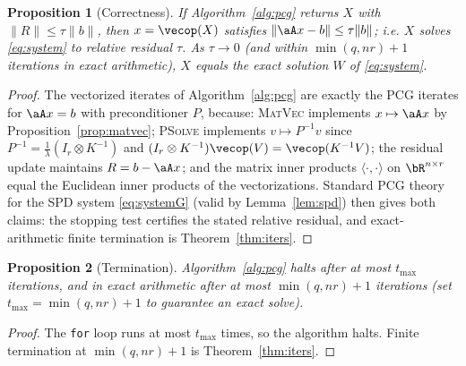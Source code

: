 \documentclass[12pt]{article}
\newtheorem{proposition}{Proposition}
\theoremstyle{definition}
\begin{document}
\begin{proposition}[Correctness]
If Algorithm~\ref{alg:pcg} returns $X$ with $\|R\|\le\tau\|b\|$, then
$x=\vecop(X)$ satisfies $\|\aA x-b\|\le\tau\|b\|$; i.e. $X$ solves
\eqref{eq:system} to relative residual $\tau$. As $\tau\to0$ (and within
$\min(q,nr)+1$ iterations in exact arithmetic), $X$ equals the exact solution
$W$ of \eqref{eq:system}.
\end{proposition}
\begin{proof}
The vectorized iterates of Algorithm~\ref{alg:pcg} are exactly the PCG iterates
for $\aA x=b$ with preconditioner $P$, because: \textsc{MatVec} implements
$x\mapsto\aA x$ by Proposition~\ref{prop:matvec}; \textsc{PSolve} implements
$v\mapsto P^{-1}v$ since $P^{-1}=\tfrac1\lambda(I_r\otimes K^{-1})$ and
$(I_r\otimes K^{-1})\vecop(V)=\vecop(K^{-1}V)$; the residual update maintains
$R=b-\aA x$; and the matrix inner products $\langle\cdot,\cdot\rangle$ on
$\bR^{n\times r}$ equal the Euclidean inner products of the vectorizations.
Standard PCG theory for the SPD system \eqref{eq:systemG} (valid by
Lemma~\ref{lem:spd}) then gives both claims: the stopping test certifies the
stated relative residual, and exact-arithmetic finite termination is
Theorem~\ref{thm:iters}.
\end{proof}

\begin{proposition}[Termination]
Algorithm~\ref{alg:pcg} halts after at most $t_{\max}$ iterations, and in exact
arithmetic after at most $\min(q,nr)+1$ iterations (set
$t_{\max}=\min(q,nr)+1$ to guarantee an exact solve).
\end{proposition}
\begin{proof}
The \texttt{for} loop runs at most $t_{\max}$ times, so the algorithm halts.
Finite termination at $\min(q,nr)+1$ is Theorem~\ref{thm:iters}.
\end{proof}
\end{document}
